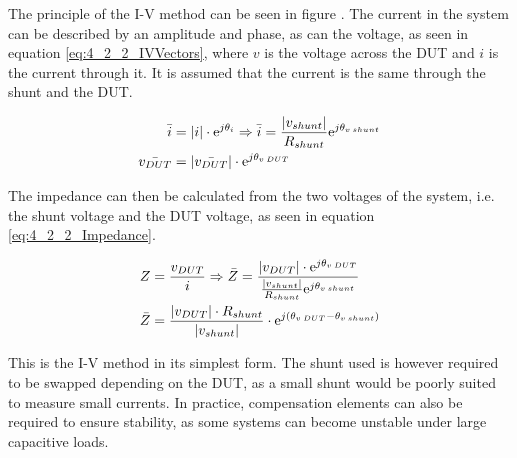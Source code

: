 The principle of the I-V method can be seen in figure . The current in the system can be described by an amplitude and phase, as can the voltage, as seen in equation \ref{eq:4_2_2_IVVectors}, where $v$ is the voltage across the DUT and $i$ is the current through it. It is assumed that the current is the same through the shunt and the DUT.

\begin{equation}
    \label{eq:4_2_2_IVVectors}
    \begin{split}
        \bar{i} & = |i|\cdot\mathrm{e} ^{j\theta_i} \Rightarrow \bar{i} = \frac{|v_{shunt}|}{R_{shunt}}\mathrm{e} ^{j\theta_{v\:shunt}}\\
        \bar{v_{DUT}} & = |\bar{v_{DUT}}| \cdot\mathrm{e} ^{j\theta_{v\:DUT}}
    \end{split}
\end{equation}

The impedance can then be calculated from the two voltages of the system, i.e. the shunt voltage and the DUT voltage, as seen in equation \ref{eq:4_2_2_Impedance}.

\begin{equation}
    \label{eq:4_2_2_Impedance}
    \begin{split}
        Z & = \frac{v_{DUT}}{i} \Rightarrow \bar{Z} = \frac{|v_{DUT}| \cdot\mathrm{e} ^{j\theta_{v\:DUT}}}{\frac{|v_{shunt}|}{R_{shunt}}\mathrm{e} ^{j\theta_{v\:shunt}}} \\
        \bar{Z} & = \frac{|v_{DUT}|\cdot R_{shunt}}{|v_{shunt}|}\cdot \mathrm{e} ^{j\left(\theta_{v\:DUT}-\theta_{v\:shunt}\right)}
    \end{split}
\end{equation}

This is the I-V method in its simplest form. The shunt used is however required to be swapped depending on the DUT, as a small shunt would be poorly suited to measure small currents. In practice, compensation elements can also be required to ensure stability, as some systems can become unstable under large capacitive loads.